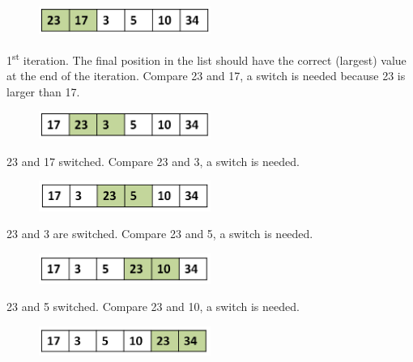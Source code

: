 \begin{figure}[H]
\centering
\includegraphics[width=0.5\textwidth]{pictures/bubble2.png}
\label{fig:bubble2}
\end{figure}

1\textsuperscript{st} iteration.  The final position in the list should have the correct (largest) value at the end of the iteration.  
Compare 23 and 17, a switch is needed because 23 is larger than 17.

\begin{figure}[H]
\centering
\includegraphics[width=0.5\textwidth]{pictures/bubble3.png}
\label{fig:bubble3}
\end{figure}

23 and 17 switched. Compare 23 and 3, a switch is needed.

\begin{figure}[H]
\centering
\includegraphics[width=0.5\textwidth]{pictures/bubble4.png}
\label{fig:bubble4}
\end{figure}

23 and 3 are switched. Compare 23 and 5, a switch is needed.

\begin{figure}[H]
\centering
\includegraphics[width=0.5\textwidth]{pictures/bubble5.png}
\label{fig:bubble5}
\end{figure}

23 and 5 switched. Compare 23 and 10, a switch is needed.

\begin{figure}[H]
\centering
\includegraphics[width=0.5\textwidth]{pictures/bubble6.png}
\label{fig:bubble6}
\end{figure}

